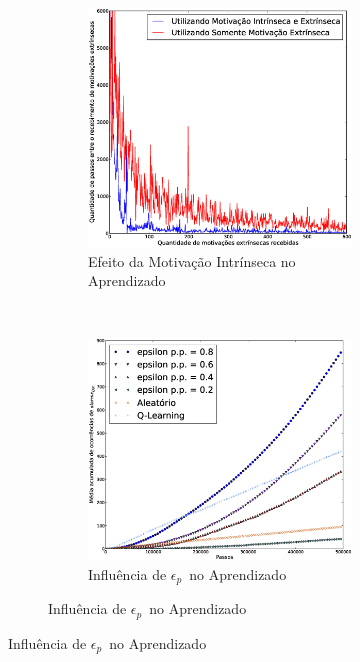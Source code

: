 \documentclass[kdmile,a4paper]{kdmile} %
\newcommand{\epS}{\epsilon_{p}}
\newcommand{\ep}{$\epS$}
\begin{document}
\begin{figure}
  \centering
  \begin{subfigure}[b]{\textwidth}
    \centering
    \begin{subfigure}[b]{0.47\textwidth}
      \includegraphics[width=\textwidth]{EfeitoMI}
      \caption{Efeito da Motivação Intrínseca no Aprendizado}
      \label{fig:mi}
    \end{subfigure}
    ~
    \begin{subfigure}[b]{0.47\textwidth}
      \includegraphics[width=\textwidth]{toyonxstep-mediaacum-epsopt-parcial-02-04-06-08}
      \caption{Influência de \ep\ no Aprendizado}
      \label{fig:ep}
    \end{subfigure}
  \end{subfigure}


\end{figure}
\end{document}
